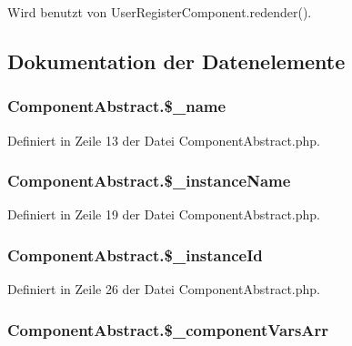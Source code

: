 Wird benutzt von UserRegisterComponent.redender().

\subsection{Dokumentation der Datenelemente}
\subsubsection{\setlength{\rightskip}{0pt plus 5cm}ComponentAbstract.\$\_\-name}\label{classComponentAbstract_5fefdf56492529f0ead1db60f52f9be5}




Definiert in Zeile 13 der Datei ComponentAbstract.php.
\subsubsection{\setlength{\rightskip}{0pt plus 5cm}ComponentAbstract.\$\_\-instanceName}\label{classComponentAbstract_96f1c8ded538716ee1bb01cebd8096c2}




Definiert in Zeile 19 der Datei ComponentAbstract.php.
\subsubsection{\setlength{\rightskip}{0pt plus 5cm}ComponentAbstract.\$\_\-instanceId}\label{classComponentAbstract_330cf42ad02fe6ef9abda121098c5be7}




Definiert in Zeile 26 der Datei ComponentAbstract.php.
\subsubsection{\setlength{\rightskip}{0pt plus 5cm}ComponentAbstract.\$\_\-componentVarsArr}\label{classComponentAbstract_85cf4e9e9d662d707f937fe1c41294cb}




